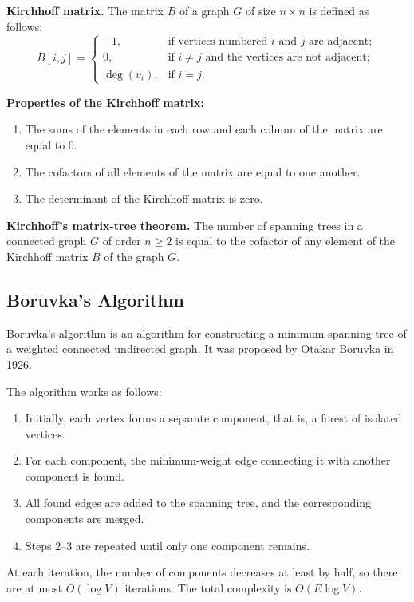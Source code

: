 \documentclass[a4paper,final]{article}
\begin{document}
\textbf{Kirchhoff matrix.} The matrix $B$ of a graph $G$ of size $n \times n$ is defined as follows:
\[
B[i,j] = \begin{cases}
-1, & \text{if vertices numbered } i \text{ and } j \text{ are adjacent};\\[2pt]
0,  & \text{if } i \neq j \text{ and the vertices are not adjacent};\\[2pt]
\deg(v_i), & \text{if } i = j.
\end{cases}
\]

\textbf{Properties of the Kirchhoff matrix:}
\begin{enumerate}
  \item The sums of the elements in each row and each column of the matrix are equal to 0.
  \item The cofactors of all elements of the matrix are equal to one another.
  \item The determinant of the Kirchhoff matrix is zero.
\end{enumerate}

\textbf{Kirchhoff's matrix-tree theorem.} The number of spanning trees in a connected graph $G$ of order $n \geq 2$ is equal to the cofactor of any element of the Kirchhoff matrix $B$ of the graph $G$.

	\subsection{Boruvka's Algorithm}

Boruvka's algorithm is an algorithm for constructing a minimum spanning tree of a weighted connected undirected graph. It was proposed by Otakar Boruvka in 1926.

The algorithm works as follows:
\begin{enumerate}
  \item Initially, each vertex forms a separate component, that is, a forest of isolated vertices.
  \item For each component, the minimum-weight edge connecting it with another component is found.
  \item All found edges are added to the spanning tree, and the corresponding components are merged.
  \item Steps 2--3 are repeated until only one component remains.
\end{enumerate}

At each iteration, the number of components decreases at least by half, so there are at most $O(\log V)$ iterations. The total complexity is $O(E \log V)$.
\end{document}

